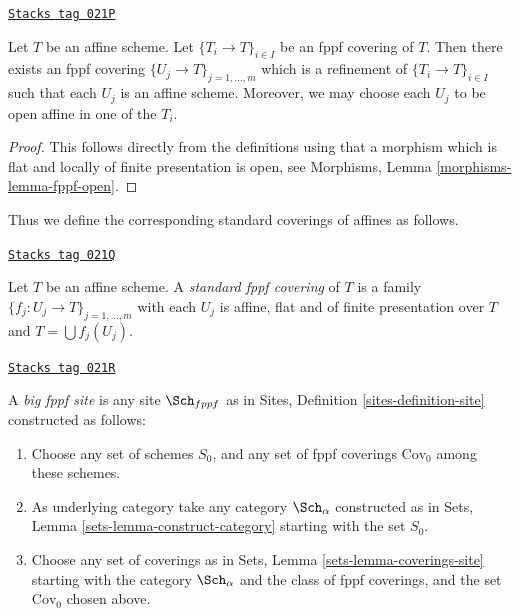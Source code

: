 \begin{lemma}
\label{topologies-lemma-fppf-affine}
\href{https://stacks.math.columbia.edu/tag/021P}{\texttt{Stacks tag 021P}}

Let $T$ be an affine scheme.
Let $\{T_i \to T\}_{i \in I}$ be an fppf covering of $T$.
Then there exists an fppf covering
$\{U_j \to T\}_{j = 1, \ldots, m}$ which is a refinement
of $\{T_i \to T\}_{i \in I}$ such that each $U_j$ is an affine
scheme. Moreover, we may choose each $U_j$ to be open affine
in one of the $T_i$.
\end{lemma}

\begin{proof}
This follows directly from the definitions using that a
morphism which is flat and locally of finite presentation is open,
see Morphisms, Lemma \ref{morphisms-lemma-fppf-open}.
\end{proof}

Thus we define the corresponding standard coverings of affines as follows.

\begin{definition}
\label{topologies-definition-standard-fppf}
\href{https://stacks.math.columbia.edu/tag/021Q}{\texttt{Stacks tag 021Q}}

Let $T$ be an affine scheme. A {\it standard fppf covering}
of $T$ is a family $\{f_j : U_j \to T\}_{j = 1, \ldots, m}$
with each $U_j$ is affine, flat and of finite presentation over $T$
and $T = \bigcup f_j(U_j)$.
\end{definition}

\begin{definition}
\label{topologies-definition-big-fppf-site}
\href{https://stacks.math.columbia.edu/tag/021R}{\texttt{Stacks tag 021R}}

A {\it big fppf site} is any site $\Sch_{fppf}$ as in
Sites, Definition \ref{sites-definition-site} constructed as follows:
\begin{enumerate}
\item Choose any set of schemes $S_0$, and any set of fppf coverings
$\text{Cov}_0$ among these schemes.
\item As underlying category take any category $\Sch_\alpha$
constructed as in Sets, Lemma \ref{sets-lemma-construct-category}
starting with the set $S_0$.
\item Choose any set of coverings as in
Sets, Lemma \ref{sets-lemma-coverings-site} starting with the
category $\Sch_\alpha$ and the class of fppf coverings,
and the set $\text{Cov}_0$ chosen above.
\end{enumerate}
\end{definition}

